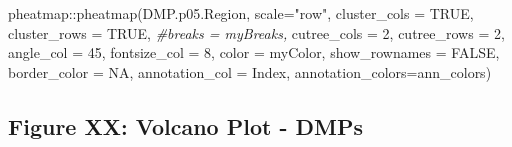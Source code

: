 \documentclass[
  10pt,
]{article}
\newenvironment{Shaded}{\begin{snugshade}}{\end{snugshade}}
\newcommand{\AttributeTok}[1]{\textcolor[rgb]{0.77,0.63,0.00}{#1}}
\newcommand{\CommentTok}[1]{\textcolor[rgb]{0.56,0.35,0.01}{\textit{#1}}}
\newcommand{\ConstantTok}[1]{\textcolor[rgb]{0.00,0.00,0.00}{#1}}
\newcommand{\DecValTok}[1]{\textcolor[rgb]{0.00,0.00,0.81}{#1}}
\newcommand{\FunctionTok}[1]{\textcolor[rgb]{0.00,0.00,0.00}{#1}}
\newcommand{\NormalTok}[1]{#1}
\newcommand{\SpecialCharTok}[1]{\textcolor[rgb]{0.00,0.00,0.00}{#1}}
\newcommand{\StringTok}[1]{\textcolor[rgb]{0.31,0.60,0.02}{#1}}
\begin{document}
\begin{Shaded}
\begin{Highlighting}[]
\NormalTok{pheatmap}\SpecialCharTok{::}\FunctionTok{pheatmap}\NormalTok{(DMP.p05.Region, }\AttributeTok{scale=}\StringTok{"row"}\NormalTok{, }
                      \AttributeTok{cluster\_cols =} \ConstantTok{TRUE}\NormalTok{, }
                      \AttributeTok{cluster\_rows =} \ConstantTok{TRUE}\NormalTok{,}
                      \CommentTok{\#breaks = myBreaks,}
                      \AttributeTok{cutree\_cols =} \DecValTok{2}\NormalTok{,}
                      \AttributeTok{cutree\_rows =} \DecValTok{2}\NormalTok{,}
                      \AttributeTok{angle\_col =} \DecValTok{45}\NormalTok{,}
                      \AttributeTok{fontsize\_col =} \DecValTok{8}\NormalTok{,}
                      \AttributeTok{color =}\NormalTok{ myColor, }
                      \AttributeTok{show\_rownames =} \ConstantTok{FALSE}\NormalTok{, }
                      \AttributeTok{border\_color =} \ConstantTok{NA}\NormalTok{, }
                      \AttributeTok{annotation\_col =}\NormalTok{ Index,}
                      \AttributeTok{annotation\_colors=}\NormalTok{ann\_colors)}
\end{Highlighting}
\end{Shaded}

\hypertarget{figure-xx-volcano-plot---dmps}{%
\subsection{Figure XX: Volcano Plot -
DMPs}\label{figure-xx-volcano-plot---dmps}}
\end{document}

